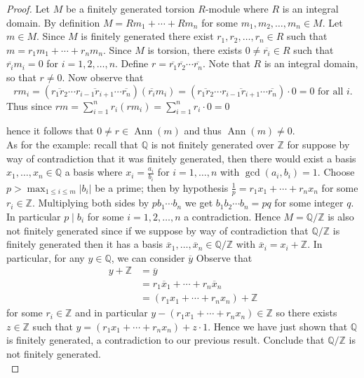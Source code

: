 \documentclass[8pt]{amsart}
\theoremstyle{plain}%
\theoremstyle{definition}
\theoremstyle{remark}
\numberwithin{equation}{section}
\newcommand{\Z}{\mathbb{Z}}
\newcommand{\Q}{\mathbb{Q}}
\newcommand{\D}{\displaystyle}
\begin{document}
	\begin{proof}
		Let $M$ be a finitely generated torsion $R$-module where $R$ is an integral domain. By definition $M = Rm_1 + \cdots + Rm_n$ for some $m_1, m_2, \ldots, m_n \in M$. Let $m \in M$. Since $M$ is finitely generated there exist $r_1, r_2, \ldots, r_n \in R$ such that $m = r_1m_1 + \cdots + r_nm_n$. Since $M$ is torsion, there exists $0 \neq \overline{r_i} \in R$ such that $\overline{r_i}m_i = 0$ for $i = 1, 2, \ldots, n$. Define $r = \overline{r_1} \overline{r_2} \cdots \overline{r_n}$. Note that $R$ is an integral domain, so that $r \neq 0$. Now observe that {\color{red} $$rm_i = (\overline{r_1r_2} \cdots \overline{r_{i - 1}r_{i + 1}} \cdots \overline{r_n})(\overline{r_i}m_i) =  (\overline{r_1r_2} \cdots \overline{r_{i - 1}r_{i + 1}} \cdots \overline{r_n}) \cdot 0 = 0 \text{ for all } i.$$ Thus since $rm = \D \sum_{i = 1}^n r_i(rm_i) = \sum_{i = 1}^n r_i \cdot 0 = 0$}

		hence it follows that $0 \neq r \in \operatorname{Ann}(m)$ and thus $\operatorname{Ann}(m) \neq 0$.\\

		As for the example: recall that $\Q$ is not finitely generated {\color{red} over $\Z$ for suppose by way of contradiction that it was finitely generated, then there would exist a basis $x_1, \ldots, x_n \in \Q$ a basis where $\D x_i = \frac{a_i}{b_i}$ for $i = 1, \ldots, n$ with $\gcd(a_i, b_i) = 1$. Choose $p > \D \max_{1 \leq i \leq m} \vert b_i \vert$ be a prime; then by hypothesis $\frac1p = r_1x_1 + \cdots + r_nx_n$ for some $r_i \in \Z$. Multiplying both sides by $pb_1\cdots b_n$ we get $b_1b_2 \cdots b_n = pq$ for some integer $q$. In particular $p \mid b_i$ for some $i = 1, 2, \ldots, n$ a contradiction.} Hence $M = \Q/\Z$ is also not finitely generated {\color{red} since if we suppose by way of contradiction that $\Q/\Z$ is finitely generated then it has a basis $\overline x_1, \ldots, \overline x_n \in \Q/\Z$ with $\overline x_i = x_i + \Z$. In particular, for any $y \in \Q$, we can consider $\overline y$ Observe that
		\begin{align*}
			y + \Z &= \overline y\\
			&= r_1\overline x_1 + \cdots + r_n \overline x_n\\
			&= (r_1x_1 + \cdots + r_nx_n) + \Z
		\end{align*}
		for some $r_i \in \Z$ and in particular $y - (r_1x_1 + \cdots + r_nx_n) \in \Z$ so there exists $z \in \Z$ such that $y =  (r_1x_1 + \cdots + r_nx_n) + z \cdot 1$. Hence we have just shown that $\Q$ is finitely generated, a contradiction to our previous result. Conclude that $\Q/\Z$ is not finitely generated.}\\ 


\end{proof}
\end{document}

